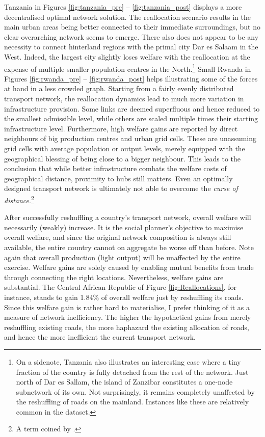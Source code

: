 \documentclass[11pt, oneside]{article}   	%
\begin{document}
Tanzania in Figures \eqref{fig:tanzania_pre} -- \eqref{fig:tanzania_post} displays a more decentralised optimal network solution. The reallocation scenario results in the main urban areas being better connected to their immediate surroundings, but no clear overarching network seems to emerge. There also does not appear to be any necessity to connect hinterland regions with the primal city Dar es Salaam in the West. Indeed, the largest city slightly loses welfare with the reallocation at the expense of multiple smaller population centres in the North.\footnote{On a sidenote, Tanzania also illustrates an interesting case where a tiny fraction of the country is fully detached from the rest of the network. Just north of Dar es Sallam, the island of Zanzibar constitutes a one-node subnetwork of its own. Not surprisingly, it remains completely unaffected by the reshuffling of roads on the mainland. Instances like these are relatively common in the dataset.} Small Rwanda in Figures \eqref{fig:rwanda_pre} -- \eqref{fig:rwanda_post} helps illustrating some of the forces at hand in a less crowded graph. Starting from a fairly evenly distributed transport network, the reallocation dynamics lead to much more variation in infrastructure provision. Some links are deemed superfluous and hence reduced to the smallest admissible level, while others are scaled multiple times their starting infrastructure level. Furthermore, high welfare gains are reported by direct neighbours of big production centres and urban grid cells. These are unassuming grid cells with average population or output levels, merely equipped with the geographical blessing of being close to a bigger neighbour. This leads to the conclusion that while better infrastructure combats the welfare costs of geographical distance, proximity to hubs still matters. Even an optimally designed transport network is ultimately not able to overcome the \emph{curse of distance}.\footnote{A term coined by \cite{Boulhol_Havedevelopedcountries_2010}.}

After successfully reshuffling a country's transport network, overall welfare will necessarily (weakly) increase. It is the social planner's objective to maximise overall welfare, and since the original network composition is always still available, the entire country cannot on aggregate be worse off than before. Note again that overall production (light output) will be unaffected by the entire exercise. Welfare gains are solely caused by enabling mutual benefits from trade through connecting the right locations. Nevertheless, welfare gains are substantial. The Central African Republic of Figure \eqref{fig:Reallocations}, for instance, stands to gain 1.84\% of overall welfare just by reshuffling its roads. Since this welfare gain is rather hard to materialise, I prefer thinking of it as a measure of network inefficiency. The higher the hypothetical gains from merely reshuffling existing roads, the more haphazard the existing allocation of roads, and hence the more inefficient the current transport network.
\end{document}
